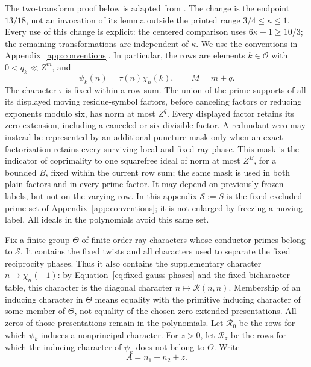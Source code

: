 \documentclass[12pt]{article}
\begin{document}
The two-transform proof below is adapted from \cite[Section 18]{QRH}.
The change is the endpoint \(13/18\), not an invocation of its lemma
outside the printed range \(3/4\le\kappa\le1\).  Every use of this
change is explicit: the centered comparison uses \(6\kappa-1\ge10/3\);
the remaining transformations are independent of \(\kappa\).
We use the conventions in Appendix~\ref{app:conventions}.  In particular, the
rows are elements \(k\in\mathcal O\) with \(0<q_k\ll Z^m\), and
\[
 \psi_k(n)=\tau(n)\chi_n(k),\qquad M=m+q.
\]
The character \(\tau\) is fixed within a row sum.  The union of the
prime supports of all its displayed moving residue-symbol factors,
before canceling factors or reducing exponents modulo six, has norm at
most \(Z^q\).  Every displayed factor retains its zero extension,
including a canceled or six-divisible factor.  A redundant zero may
instead be represented by an additional puncture mask only when an exact
factorization retains every surviving local and fixed-ray phase.  This
mask is the indicator of coprimality to one squarefree ideal of norm at
most \(Z^B\), for a bounded \(B\), fixed within the current row sum;
the same mask is used in both plain factors and in every prime factor.
It may depend on previously frozen labels, but not on the varying row.
In this appendix \(\mathcal S:=S\) is the fixed excluded prime set of
Appendix~\ref{app:conventions}; it is not enlarged by freezing a moving label.
All ideals in the polynomials avoid this same set.

Fix a finite group \(\Theta\) of finite-order ray characters whose
conductor primes belong to \(\mathcal S\).  It contains the fixed
twists and all characters used to separate the fixed reciprocity
phases.  Thus it also contains the supplementary character
\(n\mapsto\chi_n(-1)\): by
Equation~\eqref{eq:fixed-gauss-phases} and the fixed bicharacter
table, this character is the diagonal character
\(n\mapsto\mathcal R(n,n)\).  Membership of an inducing character in
\(\Theta\) means equality with the primitive inducing character of some
member of \(\Theta\), not equality of the chosen zero-extended
presentations.  All zeros of those presentations remain in the polynomials.
Let \(\mathcal R_0\) be the rows for which
\(\psi_k\) induces a nonprincipal character.  For \(z>0\), let
\(\mathcal R_z\) be the rows for which the inducing character of
\(\psi_k\) does not belong to \(\Theta\).  Write
\begin{equation}
 A=n_1+n_2+z.
 \label{old-eq:3.1}
\end{equation}
\end{document}
